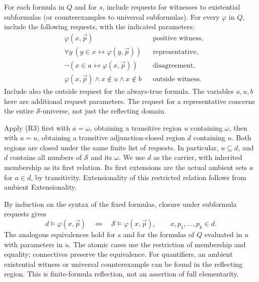 \documentclass[11pt,a4paper]{article}
\numberwithin{equation}{section}
\theoremstyle{definition}
\theoremstyle{remark}
\begin{document}
For each formula in $Q$ and for $s$, include requests for witnesses to existential subformulas (or counterexamples to universal subformulas). For every $\varphi$ in $Q$, include the following requests, with the indicated parameters:
\begin{align*}
&\varphi(x,\vec p) &&\text{positive witness},\\
&\forall y\,(y\in x\leftrightarrow\varphi(y,\vec p)) &&\text{representative},\\
&\neg(x\in a\leftrightarrow\varphi(x,\vec p)) &&\text{disagreement},\\
&\varphi(x,\vec p)\land x\notin u\land x\notin b &&\text{outside witness}.
\end{align*}
Include also the outside request for the always-true formula. The variables $a,u,b$ here are additional request parameters. The request for a representative concerns the entire $\mathcal S$-universe, not just the reflecting domain.

Apply (R3) first with $a=\omega$, obtaining a transitive region $u$ containing $\omega$, then with $a=u$, obtaining a transitive adjunction-closed region $d$ containing $u$. Both regions are closed under the same finite list of requests. In particular, $u\subseteq d$, and $d$ contains all numbers of $\mathcal S$ and its $\omega$. We use $d$ as the carrier, with inherited membership as its first relation. Its first extensions are the actual ambient sets $a$ for $a\in d$, by transitivity. Extensionality of this restricted relation follows from ambient Extensionality.

By induction on the syntax of the fixed formulas, closure under subformula requests gives
\begin{equation}\label{eq:reflect}
d\models\varphi(x,\vec p)
\quad\Longleftrightarrow\quad
\mathcal S\models\varphi(x,\vec p),
\qquad x,p_1,\ldots,p_k\in d.
\end{equation}
The analogous equivalences hold for $s$ and for the formulas of $Q$ evaluated in $u$ with parameters in $u$. The atomic cases use the restriction of membership and equality; connectives preserve the equivalence. For quantifiers, an ambient existential witness or universal counterexample can be found in the reflecting region. This is finite-formula reflection, not an assertion of full elementarity.
\end{document}

